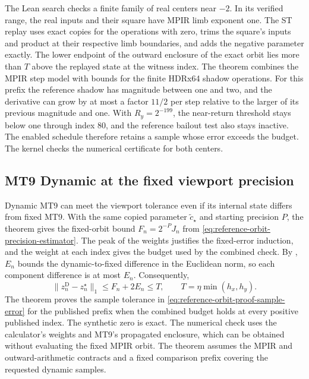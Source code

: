The Lean search checks a finite family of real centers near \(-2\).
In its verified range, the real inputs and their square have MPIR
limb exponent one. The ST replay uses exact copies for the operations
with zero, trims the square's inputs and product at their respective
limb boundaries, and adds the negative parameter exactly.
The lower endpoint of the outward enclosure of the exact orbit
lies more than \(T\) above the replayed state at the witness index.
The theorem  combines
the MPIR step model with bounds for the finite HDRx64 shadow operations.
For this prefix the reference shadow has magnitude between one and
two, and the derivative can grow by at most a factor \(11/2\) per step
relative to the larger of its previous magnitude and one.
With \(R_y=2^{-199}\), the near-return threshold stays below one
through index 80, and the reference bailout test also stays inactive.
The enabled schedule therefore retains a sample whose error exceeds
the budget. The kernel checks the numerical certificate for both
centers.

\subsection{MT9 Dynamic at the fixed viewport precision}
\label{subsec:reference-orbit-proof-mt9-viewport}

Dynamic MT9 can meet the viewport tolerance even if its internal state
differs from fixed MT9. With the same copied parameter
\(\widetilde c_\star\) and starting precision \(P\), the theorem
 gives the fixed-orbit bound
\(F_n=2^{-P}J_n\) from \eqref{eq:reference-orbit-precision-estimator}.
The peak of the weights justifies the fixed-error induction, and the
weight at each index gives the budget used by the combined check.
By , \(E_n\) bounds the dynamic-to-fixed
difference in the Euclidean norm, so each component difference is at most
\(E_n\). Consequently,
\begin{equation}
  \lVert z_n^{\mathrm D}-z_n^\star\rVert_1
  \le F_n+2E_n
  \le T,\qquad T=\eta\min(h_x,h_y).
  \label{eq:reference-orbit-proof-mt9-viewport}
\end{equation}
The theorem  proves the sample
tolerance in \eqref{eq:reference-orbit-proof-sample-error} for the
published prefix when the combined budget holds at every positive
published index. The synthetic zero is exact. The numerical check uses
the calculator's weights and MT9's propagated enclosure, which can be
obtained without evaluating the fixed MPIR orbit. The theorem assumes the
MPIR and outward-arithmetic contracts and a fixed comparison prefix
covering the requested dynamic samples.

